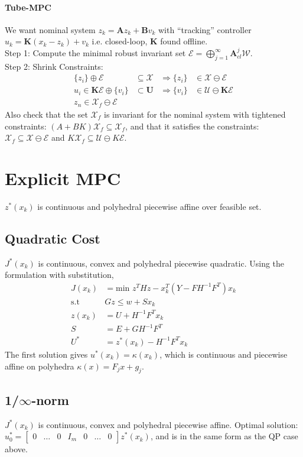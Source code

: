 \documentclass[landscape,a4paper,8pt]{scrartcl}
\renewcommand{\implies}{\Rightarrow}
\newcommand{\mc}[1]{\mathcal{#1}}
\newcommand\vA{\bm{A}}
\newcommand\vB{\bm{B}}
\newcommand\vK{\bm{K}}
\newcommand\vU{\bm{U}}
\newcommand{\Me}[1]{\begin{bmatrix}#1\end{bmatrix}} %
\begin{document}
\begin{multicols*}{3}
\paragraph{Tube-MPC}
We want nominal system $z_k = \vA z_k + \vB v_k$ with ``tracking'' controller $u_k = \vK(x_k - z_k) + v_k$ i.e. closed-loop, $\vK$ found offline. \\
Step 1: Compute the minimal robust invariant set $\mc E = \bigoplus_{j=1}^\infty \vA_{cl}^j\mc W.$ \\
Step 2: Shrink Constraints:
\begin{align*}
\{z_i\} \oplus \mc E & \subseteq \mc X & \implies \{z_i\} & \in \mc X \ominus \mc E \\
u_i \in \vK\mc E \oplus \{v_i\} & \subset \vU & \implies \{v_i\} & \in \mc U \ominus \vK\mc E \\
z_n \in \mc X_f \ominus \mc E & & &
\end{align*}
Also check that the set $\mc{X}_f$ is invariant for the nominal system with tightened constraints: $(A+BK)\mc{X}_f \subseteq \mc{X}_f$, and that it satisfies the constraints: $\mc{X}_f \subseteq \mc X \ominus \mc E$ and $K\mc{X}_f \subseteq \mc U \ominus K\mc E$.
\section{Explicit MPC}
$z^*(x_k)$ is continuous and polyhedral piecewise affine over feasible set.
\subsection{Quadratic Cost}
$J^*(x_k)$ is continuous, convex and polyhedral piecewise quadratic.
Using the formulation with substitution,
\begin{align*}
J(x_k) &= \text{min } z^T H z - x_k^T (Y - FH^{-1}F^T )x_k\\
\mathrm{s.t} \quad & Gz \le w +  Sx_k \\
	z(x_k) &= U + H^{-1} F^T x_k \\
	S &= E + G H^{-1} F^T \\
	U^* &= z^*(x_k) - H^{-1}F^Tx_k
\end{align*}
The first solution gives $u^*(x_k) = \kappa(x_k)$, which is continuous and piecewise affine on polyhedra $\kappa(x) = F_jx + g_j$.
\subsection{1/$\infty$-norm}
$J^*(x_k)$ is continuous, convex and polyhedral piecewise affine.
Optimal solution: $u^*_0 = \Me{0 & \dots & 0 & I_m & 0 & \dots & 0} z^*(x_k)$, and is in the same form as the QP case above.

\end{multicols*}
\end{document}
